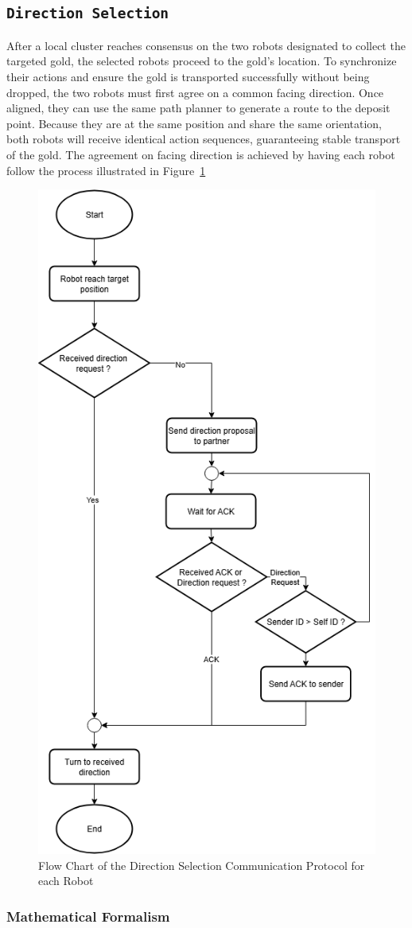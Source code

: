 \documentclass[12pt,a4paper]{article}
\begin{document}
\subsection{\texttt{Direction Selection}}
After a local cluster reaches consensus on the two robots designated to collect the targeted gold, the selected robots proceed to the gold’s location. To synchronize their actions and ensure the gold is transported successfully without being dropped, the two robots must first agree on a common facing direction. Once aligned, they can use the same path planner to generate a route to the deposit point. Because they are at the same position and share the same orientation, both robots will receive identical action sequences, guaranteeing stable transport of the gold. The agreement on facing direction is achieved by having each robot follow the process illustrated in Figure~\ref{fig:direction-flow}

\begin{figure}
    \centering
    \includegraphics[width=0.5\linewidth]{images/direction_flow.png}
    \caption{Flow Chart of the Direction Selection Communication Protocol for each Robot}   
    \label{fig:direction-flow}
\end{figure}

\subsubsection{Mathematical Formalism}
\end{document}
